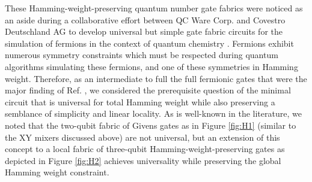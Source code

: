 \documentclass[aps,pra,twocolumn,superscriptaddress,groupedaddress]{revtex4}  %
\begin{document}
These Hamming-weight-preserving quantum number gate fabrics were noticed as an
aside during a collaborative effort between QC Ware Corp. and Covestro
Deutschland AG to develop universal but simple gate fabric circuits for the
simulation of fermions in the context of quantum chemistry \cite{anselmetti2021local}. Fermions exhibit
numerous symmetry constraints which must be respected during quantum algorithms simulating
these fermions, and one of these symmetries in Hamming weight. Therefore, as an
intermediate to full the full fermionic gates that were the major finding of
Ref. , we considered the prerequisite question of the minimal circuit that is
universal for total Hamming weight while also preserving a semblance of
simplicity and linear locality. As is well-known in the literature, we noted
that the two-qubit fabric of Givens gates as in Figure \ref{fig:H1} (similar to
the XY mixers discussed above) are not universal, but an extension of this
concept to a local fabric of three-qubit Hamming-weight-preserving gates as
depicted in Figure \ref{fig:H2} achieves universality while preserving the
global Hamming weight constraint. 
\end{document}

